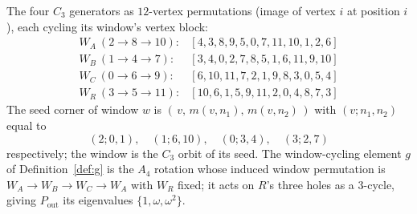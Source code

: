 \documentclass[11pt]{article}
\theoremstyle{definition}
\newcommand{\Pout}{P_{\mathrm{out}}}
\newcommand{\winA}{W_{\!A}}
\newcommand{\winB}{W_{\!B}}
\newcommand{\winC}{W_{\!C}}
\newcommand{\winR}{W_{\!R}}
\begin{document}
The four $C_3$ generators as $12$-vertex permutations (image of vertex $i$ at position
$i$), each cycling its window's vertex block:
\[
\begin{array}{ll}
\winA\ (2\!\to\!8\!\to\!10): & [4,3,8,9,5,0,7,11,10,1,2,6]\\
\winB\ (1\!\to\!4\!\to\!7):  & [3,4,0,2,7,8,5,1,6,11,9,10]\\
\winC\ (0\!\to\!6\!\to\!9):  & [6,10,11,7,2,1,9,8,3,0,5,4]\\
\winR\ (3\!\to\!5\!\to\!11): & [10,6,1,5,9,11,2,0,4,8,7,3]
\end{array}
\]
The seed corner of window $w$ is $(\,v,\,m(v,n_1),\,m(v,n_2)\,)$ with $(v;n_1,n_2)$
equal to
\[
  (2;0,1),\allowbreak\quad (1;6,10),\allowbreak\quad (0;3,4),\allowbreak\quad (3;2,7)
\]
respectively; the window is the $C_3$ orbit of its seed. The window-cycling element $g$
of Definition~\ref{def:g} is the $A_4$ rotation whose induced window permutation is
$\winA\to\winB\to\winC\to\winA$ with $\winR$ fixed; it acts on $R$'s three holes as a
$3$-cycle, giving $\Pout$ its eigenvalues $\{1,\omega,\omega^2\}$.
\end{document}
